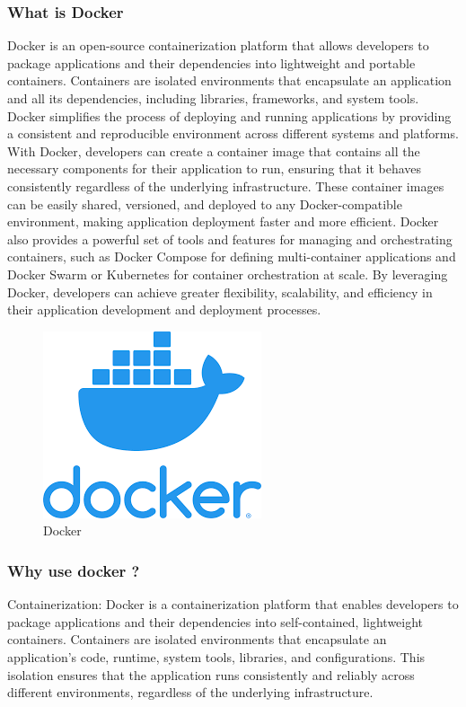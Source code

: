 \documentclass[
12pt,
oneside, 
onehalfspacing, 
nolistspacing, 
parskip, 
chapterinoneline, 
]{AASTCOMPUTER}
\begin{document}
\subsubsection{What is Docker}
Docker is an open-source containerization platform that allows developers to package applications and their dependencies into lightweight and portable containers. Containers are isolated environments that encapsulate an application and all its dependencies, including libraries, frameworks, and system tools. Docker simplifies the process of deploying and running applications by providing a consistent and reproducible environment across different systems and platforms. With Docker, developers can create a container image that contains all the necessary components for their application to run, ensuring that it behaves consistently regardless of the underlying infrastructure. These container images can be easily shared, versioned, and deployed to any Docker-compatible environment, making application deployment faster and more efficient. Docker also provides a powerful set of tools and features for managing and orchestrating containers, such as Docker Compose for defining multi-container applications and Docker Swarm or Kubernetes for container orchestration at scale. By leveraging Docker, developers can achieve greater flexibility, scalability, and efficiency in their application development and deployment processes.

\begin{figure}[!ht]
	\centering
	\includegraphics[scale=0.5]{Figures/DevOps/docker.png}
  	\caption{Docker}
  	\label{fig:Docker}
\end{figure}
\subsubsection{Why use docker ?}
Containerization: Docker is a containerization platform that enables developers to package applications and their dependencies into self-contained, lightweight containers. Containers are isolated environments that encapsulate an application's code, runtime, system tools, libraries, and configurations. This isolation ensures that the application runs consistently and reliably across different environments, regardless of the underlying infrastructure.
\end{document}
